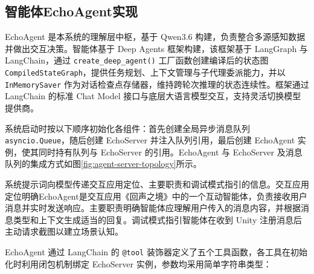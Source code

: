 \documentclass[bachelor]{njupthesis}
\begin{document}
\subsection{智能体EchoAgent实现}

EchoAgent 是本系统的理解层中枢，基于 Qwen3.6 构建，负责整合多源感知数据并做出交互决策。智能体基于 Deep Agents 框架构建，该框架基于 LangGraph 与 LangChain，通过 \texttt{create\_deep\_agent()} 工厂函数创建编译后的状态图 \texttt{CompiledStateGraph}，提供任务规划、上下文管理与子代理委派能力，并以 \texttt{InMemorySaver} 作为对话检查点存储器，维持跨轮次推理的状态连续性。框架通过 LangChain 的标准 Chat Model 接口与底层大语言模型交互，支持灵活切换模型提供商。

系统启动时按以下顺序初始化各组件：首先创建全局异步消息队列 \texttt{asyncio.Queue}，随后创建 EchoServer 并注入队列引用，最后创建 EchoAgent 实例，使其同时持有队列与 EchoServer 的引用。EchoAgent 与 EchoServer 及消息队列的集成方式如图\ref{fig:agent-server-topology}所示。

系统提示词向模型传递交互应用定位、主要职责和调试模式指引的信息。交互应用定位明确EchoAgent是交互应用《回声之境》中的一个互动智能体，负责接收用户消息并实时发送响应。主要职责明确智能体应理解用户传入的消息内容，并根据消息类型和上下文生成适当的回复。调试模式指引智能体在收到 Unity 注册消息后主动请求截图以建立场景认知。

EchoAgent 通过 LangChain 的 \texttt{@tool} 装饰器定义了五个工具函数，各工具在初始化时利用闭包机制绑定 EchoServer 实例，参数均采用简单字符串类型：
\end{document}
